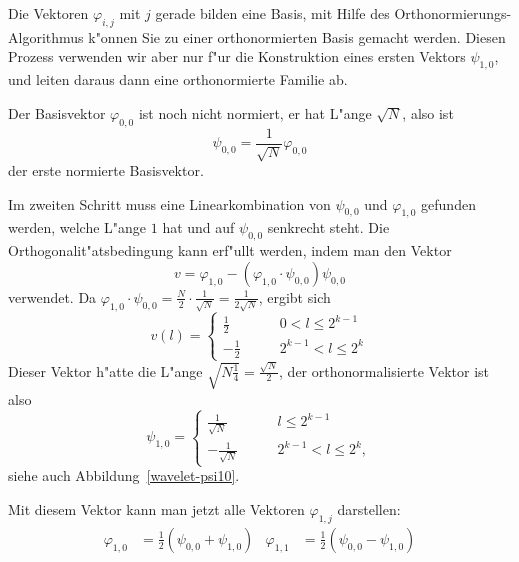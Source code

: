 Die Vektoren $\varphi_{i,j}$ mit $j$ gerade bilden eine Basis,
mit Hilfe des Orthonormierungs-Algorithmus k"onnen Sie zu einer
orthonormierten Basis gemacht werden. Diesen Prozess verwenden
wir aber nur f"ur die Konstruktion eines ersten Vektors $\psi_{1,0}$,
und leiten daraus dann eine orthonormierte Familie ab.

Der Basisvektor $\varphi_{0,0}$ ist noch nicht
normiert, er hat L"ange $\sqrt{N}$, also ist
$$
\psi_{0,0}=\frac1{\sqrt{N}}\varphi_{0,0}
$$
der erste normierte Basisvektor.

Im zweiten Schritt muss eine Linearkombination von $\psi_{0,0}$
und $\varphi_{1,0}$ gefunden werden, welche L"ange $1$ hat und
auf $\psi_{0,0}$ senkrecht steht. Die Orthogonalit"atsbedingung
kann erf"ullt werden, indem man den Vektor
\[
v=\varphi_{1,0}-(\varphi_{1,0}\cdot\psi_{0,0})\psi_{0,0}
\]
verwendet. Da $\varphi_{1,0}\cdot\psi_{0,0}=\frac{N}2\cdot\frac1{\sqrt{N}}
=\frac1{2\sqrt{N}}$,
ergibt sich
\[
v(l)=\begin{cases}
\frac12&\qquad 0<l\le 2^{k-1}\\
-\frac12&\qquad 2^{k-1}<l\le 2^{k}
\end{cases}
\]
Dieser Vektor h"atte die L"ange $\sqrt{N\frac14}=\frac{\sqrt{N}}2$,
der orthonormalisierte Vektor ist also
\[
\psi_{1,0}=\begin{cases}
\frac1{\sqrt{N}}&\qquad l\le 2^{k-1}\\
-\frac{1}{\sqrt{N}}&\qquad 2^{k-1}<l\le 2^{k},
\end{cases}
\]
siehe auch Abbildung~\ref{wavelet-psi10}.

Mit diesem Vektor kann man jetzt alle Vektoren $\varphi_{1,j}$
darstellen:
\begin{align}
\varphi_{1,0}&=\frac12(\psi_{0,0}+\psi_{1,0})
&
\varphi_{1,1}&=\frac12(\psi_{0,0}-\psi_{1,0})
\label{psikonstruktion}
\end{align}

